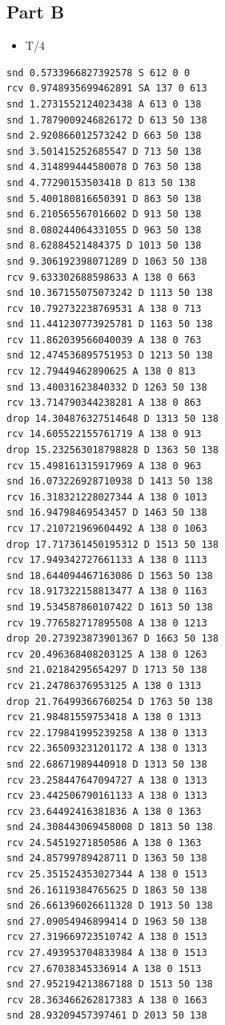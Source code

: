 \documentclass[11pt]{article}
\begin{document}
\subsection{Part B}
\label{sec:org7b82f44}
\begin{itemize}
\item T/4
\end{itemize}
\begin{verbatim}
snd 0.5733966827392578 S 612 0 0
rcv 0.9748935699462891 SA 137 0 613
snd 1.2731552124023438 A 613 0 138
snd 1.7879009246826172 D 613 50 138
snd 2.920866012573242 D 663 50 138
snd 3.501415252685547 D 713 50 138
snd 4.314899444580078 D 763 50 138
snd 4.77290153503418 D 813 50 138
snd 5.400180816650391 D 863 50 138
snd 6.210565567016602 D 913 50 138
snd 8.080244064331055 D 963 50 138
snd 8.62884521484375 D 1013 50 138
snd 9.306192398071289 D 1063 50 138
rcv 9.633302688598633 A 138 0 663
snd 10.367155075073242 D 1113 50 138
rcv 10.792732238769531 A 138 0 713
snd 11.441230773925781 D 1163 50 138
rcv 11.862039566040039 A 138 0 763
snd 12.474536895751953 D 1213 50 138
rcv 12.79449462890625 A 138 0 813
snd 13.40031623840332 D 1263 50 138
rcv 13.714790344238281 A 138 0 863
drop 14.304876327514648 D 1313 50 138
rcv 14.605522155761719 A 138 0 913
drop 15.232563018798828 D 1363 50 138
rcv 15.498161315917969 A 138 0 963
snd 16.073226928710938 D 1413 50 138
rcv 16.318321228027344 A 138 0 1013
snd 16.94798469543457 D 1463 50 138
rcv 17.210721969604492 A 138 0 1063
drop 17.717361450195312 D 1513 50 138
rcv 17.949342727661133 A 138 0 1113
snd 18.644094467163086 D 1563 50 138
rcv 18.917322158813477 A 138 0 1163
snd 19.534587860107422 D 1613 50 138
rcv 19.776582717895508 A 138 0 1213
drop 20.273923873901367 D 1663 50 138
rcv 20.496368408203125 A 138 0 1263
snd 21.02184295654297 D 1713 50 138
rcv 21.24786376953125 A 138 0 1313
drop 21.76499366760254 D 1763 50 138
rcv 21.98481559753418 A 138 0 1313
rcv 22.179841995239258 A 138 0 1313
rcv 22.365093231201172 A 138 0 1313
snd 22.68671989440918 D 1313 50 138
rcv 23.258447647094727 A 138 0 1313
rcv 23.442506790161133 A 138 0 1313
rcv 23.64492416381836 A 138 0 1363
snd 24.308443069458008 D 1813 50 138
rcv 24.54519271850586 A 138 0 1363
snd 24.85799789428711 D 1363 50 138
rcv 25.351524353027344 A 138 0 1513
snd 26.16119384765625 D 1863 50 138
snd 26.661396026611328 D 1913 50 138
snd 27.09054946899414 D 1963 50 138
rcv 27.319669723510742 A 138 0 1513
rcv 27.493953704833984 A 138 0 1513
rcv 27.67038345336914 A 138 0 1513
snd 27.952194213867188 D 1513 50 138
rcv 28.363466262817383 A 138 0 1663
snd 28.93209457397461 D 2013 50 138

\end{verbatim}
\end{document}
